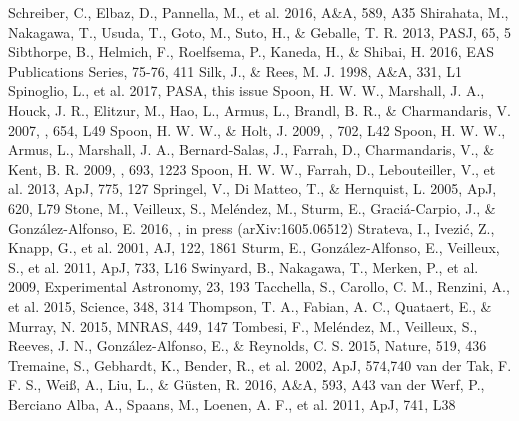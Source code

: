 \documentclass{pasa}%
\begin{document}
\begin{thebibliography}{}
  Schreiber, C., Elbaz,
    D., Pannella, M., et al. 2016, A\&A, 589, A35
   Shirahata, M., Nakagawa, T., Usuda,
    T., Goto, M., Suto, H., \& Geballe, T. R. 2013, PASJ, 65, 5
   Sibthorpe, B., Helmich, F.,
    Roelfsema, P., Kaneda, H., \& Shibai, H. 2016, EAS Publications Series,
    75-76, 411 
   Silk, J., \& Rees, M. J. 1998, A\&A,
    331, L1
   Spinoglio, L., et al. 2017, PASA,
    this issue
   Spoon, H. W. W., Marshall, J. A., Houck,
    J. R., Elitzur, M., Hao, L., Armus, L., Brandl, B. R., \& Charmandaris,
    V. 2007, \apj, 654, L49
   Spoon, H. W. W.,  \& Holt, J. 2009,
    \apj, 702, L42
   Spoon, H. W. W., Armus, L., Marshall,
    J. A., Bernard-Salas, J., Farrah, D., Charmandaris, V., \& Kent,
    B. R. 2009, \apj, 693, 1223
   Spoon, H. W. W.,  Farrah, D.,
    Lebouteiller, V., et al. 2013, ApJ, 775, 127 
   Springel, V., Di Matteo, T., \&
    Hernquist, L. 2005, ApJ, 620, L79
   Stone, M., Veilleux, S., Mel\'endez, M.,
    Sturm, E., Graci\'a-Carpio, J., \& Gonz\'alez-Alfonso, E. 2016, \apj, in
    press (arXiv:1605.06512)
   Strateva, I., Ivezi\'c, Z., Knapp,
    G., et al. 2001, AJ, 122, 1861
   Sturm, E., Gonz\'alez-Alfonso, E.,
    Veilleux, S., et al. 2011, ApJ, 733, L16 
   Swinyard, B., Nakagawa, T., Merken,
    P., et al. 2009, Experimental Astronomy, 23, 193
   Tacchella, S., Carollo, C. M.,
    Renzini, A., et al. 2015, Science, 348, 314
   Thompson, T. A., Fabian, A. C.,
    Quataert, E., \& Murray, N. 2015, MNRAS, 449, 147
   Tombesi, F., Mel\'endez, M., Veilleux,
    S., Reeves, J. N., Gonz\'alez-Alfonso, E., \& Reynolds, C. S. 2015,
    Nature, 519, 436
   Tremaine, S., Gebhardt, K., Bender, 
    R., et al. 2002, ApJ, 574,740
  van der Tak, F. F. S., Wei\ss, A.,
    Liu, L., \& G\"usten, R. 2016, A\&A, 593, A43
   van der Werf, P., Berciano Alba,
    A., Spaans, M., Loenen, A. F., et al. 2011, ApJ, 741, L38

\end{thebibliography}
\end{document}
